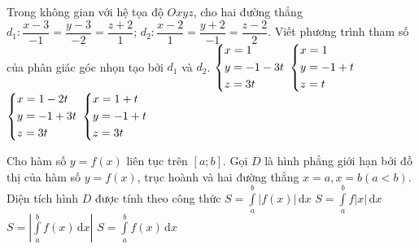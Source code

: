 \begin{ex}%
	Trong không gian với hệ tọa độ $Oxyz$, cho hai đường thẳng $d_1: \dfrac{x-3}{-1}=\dfrac{y-3}{-2}=\dfrac{z+2}{1}$; $d_2: \dfrac{x-2}{1}=\dfrac{y+2}{-1}=\dfrac{z-2}{2}$. Viết phương trình tham số của phân giác góc nhọn tạo bởi $d_1$ và $d_2$.
	\choice
	{\True $\left\{\begin{aligned}&x=1\\&y=-1-3t\\&z=3t\end{aligned}\right.$}
	{$\left\{\begin{aligned}&x=1\\&y=-1+t\\&z=t\end{aligned}\right.$}
	{$\left\{\begin{aligned}&x=1-2t\\&y=-1+3t\\&z=3t\end{aligned}\right.$}
	{$\left\{\begin{aligned}&x=1+t\\&y=-1+t\\&z=3t\end{aligned}\right.$}
\end{ex}

\begin{ex}%
	Cho hàm số $y=f(x)$ liên tục trên $\left[a;b \right]$. Gọi $D$ là hình phẳng giới hạn bởi đồ thị của hàm số $y=f(x)$, trục hoành và hai đường thẳng $x=a,x=b(a<b)$. Diện tích hình $D$ được tính theo công thức
	\choice
	{\True $S=\displaystyle\int\limits_a^b |f(x)|\mathrm{\,d}x$}
	{$S=\displaystyle\int\limits_a^b f|x|\mathrm{\,d}x$}
	{$S=\left|\displaystyle\int\limits_a^b f(x)\mathrm{\,d}x\right|$}
	{$S=\displaystyle\int\limits_a^b f(x)\mathrm{\,d}x$}
\end{ex}

